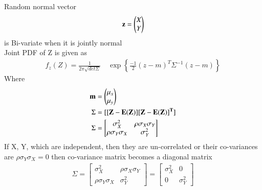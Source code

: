 \documentclass[journal,12pt,twocolumn]{IEEEtran}
\begin{document}
\begin{enumerate}[label=\arabic*.,ref=\theenumi]
Random normal vector \begin{align}
\mathbf{z} = \begin{pmatrix}
X\\
Y\end{pmatrix}
\end{align} is Bi-variate when it is jointly normal\\
Joint PDF of Z is given as\\
\begin{align}
    f_z(Z) = \frac{1} {2\pi\sqrt{det {\Sigma}}} \quad \exp \left \{  \frac{-1}{2}(z-m) ^ T \Sigma^{-1} (z-m) \right \} 
    \end{align}
        Where
    \begin{align}
    \mathbf{m} &= \begin{pmatrix}
         \mu_x\\
         \mu_y
\end{pmatrix}
\\
\Sigma &= \mathbf{[[Z - E(Z)] [Z - E(Z)]^T]}\\
    \Sigma &= \begin{bmatrix}
         \sigma_{X}^2               &    \rho \sigma_{X} \sigma_{Y}\\
         \rho \sigma_{Y} \sigma_{X}  &    \sigma_{Y}^2
        \end{bmatrix}
\end{align}
If X, Y, which  are independent, then they are un-correlated or their co-variances are $\rho \sigma_{Y} \sigma_{X} = 0$ then co-variance matrix becomes a diagonal matrix\\

\begin{align}
    \Sigma = \begin{bmatrix}
         \sigma_{X}^2                  &     \rho \sigma_{X} \sigma_{Y}\\
         \rho \sigma_{Y} \sigma_{X}     &      \sigma_{Y}^2
        \end{bmatrix} 
        = \begin{bmatrix}
         \sigma_{X}^2      & 0\\
          0  & \sigma_{Y}^2
        \end{bmatrix}
\end{align}\\

\end{enumerate}
\end{document}
